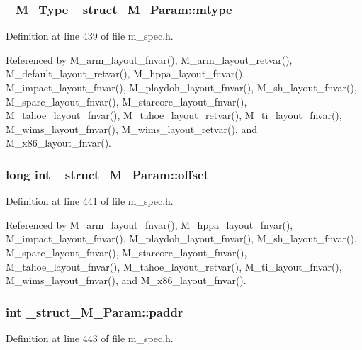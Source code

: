 \subsubsection{\setlength{\rightskip}{0pt plus 5cm}\bf{\_\-M\_\-Type} \bf{\_\-struct\_\-M\_\-Param::mtype}}\label{struct__struct__M__Param_b205e35f37d678f0be261cf86be2971e}




Definition at line 439 of file m\_\-spec.h.

Referenced by M\_\-arm\_\-layout\_\-fnvar(), M\_\-arm\_\-layout\_\-retvar(), M\_\-default\_\-layout\_\-retvar(), M\_\-hppa\_\-layout\_\-fnvar(), M\_\-impact\_\-layout\_\-fnvar(), M\_\-playdoh\_\-layout\_\-fnvar(), M\_\-sh\_\-layout\_\-fnvar(), M\_\-sparc\_\-layout\_\-fnvar(), M\_\-starcore\_\-layout\_\-fnvar(), M\_\-tahoe\_\-layout\_\-fnvar(), M\_\-tahoe\_\-layout\_\-retvar(), M\_\-ti\_\-layout\_\-fnvar(), M\_\-wims\_\-layout\_\-fnvar(), M\_\-wims\_\-layout\_\-retvar(), and M\_\-x86\_\-layout\_\-fnvar().
\subsubsection{\setlength{\rightskip}{0pt plus 5cm}long int \bf{\_\-struct\_\-M\_\-Param::offset}}\label{struct__struct__M__Param_2df9b45c0132e5235169cd824a81260c}




Definition at line 441 of file m\_\-spec.h.

Referenced by M\_\-arm\_\-layout\_\-fnvar(), M\_\-hppa\_\-layout\_\-fnvar(), M\_\-impact\_\-layout\_\-fnvar(), M\_\-playdoh\_\-layout\_\-fnvar(), M\_\-sh\_\-layout\_\-fnvar(), M\_\-sparc\_\-layout\_\-fnvar(), M\_\-starcore\_\-layout\_\-fnvar(), M\_\-tahoe\_\-layout\_\-fnvar(), M\_\-tahoe\_\-layout\_\-retvar(), M\_\-ti\_\-layout\_\-fnvar(), M\_\-wims\_\-layout\_\-fnvar(), and M\_\-x86\_\-layout\_\-fnvar().
\subsubsection{\setlength{\rightskip}{0pt plus 5cm}int \bf{\_\-struct\_\-M\_\-Param::paddr}}\label{struct__struct__M__Param_19de4c91586aea8ed1cd219b54942fc4}




Definition at line 443 of file m\_\-spec.h.

